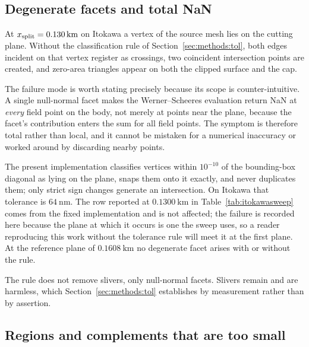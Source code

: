 \subsection{Degenerate facets and total NaN}
\label{sec:failures:nan}

At $x_{\mathrm{split}} = \SI{0.130}{\kilo\metre}$ on Itokawa a vertex of the source
mesh lies on the cutting plane. Without the classification rule of
Section~\ref{sec:methods:tol}, both edges incident on that vertex register
as crossings, two coincident intersection points are created, and
zero-area triangles appear on both the clipped surface and the cap.

The failure mode is worth stating precisely because its scope is
counter-intuitive. A single null-normal facet makes the Werner--Scheeres
evaluation return NaN at \emph{every} field point on the body, not merely
at points near the plane, because the facet's contribution enters the sum
for all field points. The symptom is therefore total rather than local,
and it cannot be mistaken for a numerical inaccuracy or worked around by
discarding nearby points.

The present implementation classifies vertices within $10^{-10}$ of the
bounding-box diagonal as lying on the plane, snaps them onto it exactly,
and never duplicates them; only strict sign changes generate an
intersection. On Itokawa that tolerance is $\SI{64}{\nano\metre}$. The row
reported at $\SI{0.1300}{\kilo\metre}$ in
Table~\ref{tab:itokawasweep} comes from the fixed implementation and is
not affected; the failure is recorded here because the plane at which it
occurs is one the sweep uses, so a reader reproducing this work without
the tolerance rule will meet it at the first plane. At the reference plane
of $\SI{0.1608}{\kilo\metre}$ no degenerate facet arises with or without
the rule.

The rule does not remove slivers, only null-normal facets. Slivers remain
and are harmless, which Section~\ref{sec:methods:tol} establishes by
measurement rather than by assertion.

\subsection{Regions and complements that are too small}
\label{sec:failures:small}

